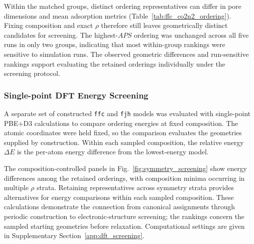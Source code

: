 \documentclass[a5paper, 10pt]{article}
\begin{document}
Within the matched groups, distinct ordering representatives can differ in pore dimensions and mean adsorption metrics (Table~\ref{tab:ffc_co2n2_ordering}). Fixing composition and exact $\rho$ therefore still leaves geometrically distinct candidates for screening. The highest-$APS$ ordering was unchanged across all five runs in only two groups, indicating that most within-group rankings were sensitive to simulation runs. The observed geometric differences and run-sensitive rankings support evaluating the retained orderings individually under the screening protocol.


\subsubsection{Single-point DFT Energy Screening}

A separate set of constructed \texttt{ffc} and \texttt{fjh} models was evaluated with single-point PBE+D3 calculations to compare ordering energies at fixed composition. The atomic coordinates were held fixed, so the comparison evaluates the geometries supplied by construction. Within each sampled composition, the relative energy $\Delta E$ is the per-atom energy difference from the lowest-energy model.

The composition-controlled panels in Fig.~\ref{fig:symmetry_screening} show energy differences among the retained orderings, with composition minima occurring in multiple $\rho$ strata. Retaining representatives across symmetry strata provides alternatives for energy comparisons within each sampled composition. These calculations demonstrate the connection from canonical assignments through periodic construction to electronic-structure screening; the rankings concern the sampled starting geometries before relaxation. Computational settings are given in Supplementary Section~\ref{app:dft_screening}.
\end{document}
